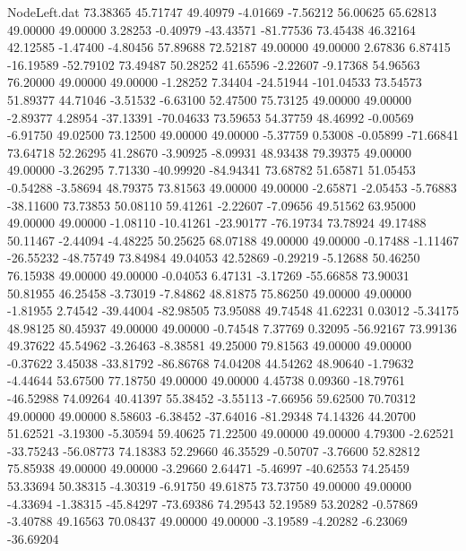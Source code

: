 \begin{filecontents}{NodeLeft.dat}
  73.38365   45.71747   49.40979    -4.01669   -7.56212   56.00625   65.62813   49.00000   49.00000    3.28253   -0.40979  -43.43571  -81.77536
  73.45438   46.32164   42.12585    -1.47400   -4.80456   57.89688   72.52187   49.00000   49.00000    2.67836    6.87415  -16.19589  -52.79102
  73.49487   50.28252   41.65596    -2.22607   -9.17368   54.96563   76.20000   49.00000   49.00000   -1.28252    7.34404  -24.51944 -101.04533
  73.54573   51.89377   44.71046    -3.51532   -6.63100   52.47500   75.73125   49.00000   49.00000   -2.89377    4.28954  -37.13391  -70.04633
  73.59653   54.37759   48.46992    -0.00569   -6.91750   49.02500   73.12500   49.00000   49.00000   -5.37759    0.53008   -0.05899  -71.66841
  73.64718   52.26295   41.28670    -3.90925   -8.09931   48.93438   79.39375   49.00000   49.00000   -3.26295    7.71330  -40.99920  -84.94341
  73.68782   51.65871   51.05453    -0.54288   -3.58694   48.79375   73.81563   49.00000   49.00000   -2.65871   -2.05453   -5.76883  -38.11600
  73.73853   50.08110   59.41261    -2.22607   -7.09656   49.51562   63.95000   49.00000   49.00000   -1.08110  -10.41261  -23.90177  -76.19734
  73.78924   49.17488   50.11467    -2.44094   -4.48225   50.25625   68.07188   49.00000   49.00000   -0.17488   -1.11467  -26.55232  -48.75749
  73.84984   49.04053   42.52869    -0.29219   -5.12688   50.46250   76.15938   49.00000   49.00000   -0.04053    6.47131   -3.17269  -55.66858
  73.90031   50.81955   46.25458    -3.73019   -7.84862   48.81875   75.86250   49.00000   49.00000   -1.81955    2.74542  -39.44004  -82.98505
  73.95088   49.74548   41.62231     0.03012   -5.34175   48.98125   80.45937   49.00000   49.00000   -0.74548    7.37769    0.32095  -56.92167
  73.99136   49.37622   45.54962    -3.26463   -8.38581   49.25000   79.81563   49.00000   49.00000   -0.37622    3.45038  -33.81792  -86.86768
  74.04208   44.54262   48.90640    -1.79632   -4.44644   53.67500   77.18750   49.00000   49.00000    4.45738    0.09360  -18.79761  -46.52988
  74.09264   40.41397   55.38452    -3.55113   -7.66956   59.62500   70.70312   49.00000   49.00000    8.58603   -6.38452  -37.64016  -81.29348
  74.14326   44.20700   51.62521    -3.19300   -5.30594   59.40625   71.22500   49.00000   49.00000    4.79300   -2.62521  -33.75243  -56.08773
  74.18383   52.29660   46.35529    -0.50707   -3.76600   52.82812   75.85938   49.00000   49.00000   -3.29660    2.64471   -5.46997  -40.62553
  74.25459   53.33694   50.38315    -4.30319   -6.91750   49.61875   73.73750   49.00000   49.00000   -4.33694   -1.38315  -45.84297  -73.69386
  74.29543   52.19589   53.20282    -0.57869   -3.40788   49.16563   70.08437   49.00000   49.00000   -3.19589   -4.20282   -6.23069  -36.69204

\end{filecontents}
